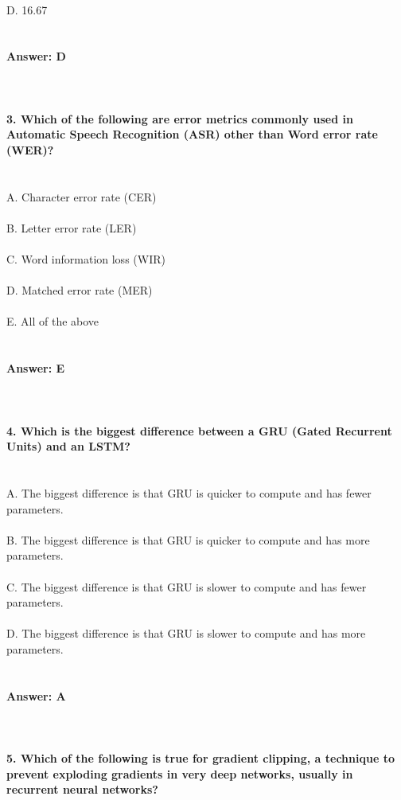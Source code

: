 \documentclass[prl,twocolumn,showpacs,preprintnumbers,superscriptaddress]{revtex4}
\theoremstyle{plain}
\theoremstyle{definition}
\begin{document}
\begin{widetext}
\\
D. 16.67%
\\
\\
\\
\textbf{Answer: D}
\\
\\
\\
\\
\textbf{3. Which of the following are error metrics commonly used in Automatic Speech Recognition (ASR) other than Word error rate (WER)?}
\\
\\
\\
A. Character error rate (CER)
\\
\\
B. Letter error rate (LER)
\\
\\
C. Word information loss (WIR)
\\
\\
D. Matched error rate (MER)
\\
\\
E. All of the above
\\
\\
\\
\textbf{Answer: E}
\\
\\
\\
\\
\textbf{4. Which is the biggest difference between a GRU (Gated Recurrent Units) and an LSTM?}
\\
\\
\\
A. The biggest difference is that GRU is quicker to compute and has fewer parameters.
\\
\\
B. The biggest difference is that GRU is quicker to compute and has more parameters.
\\
\\
C. The biggest difference is that GRU is slower to compute and has fewer parameters.
\\
\\
D. The biggest difference is that GRU is slower to compute and has more parameters.
\\
\\
\\
\textbf{Answer: A}
\\
\\
\\
\\
\textbf{5. Which of the following is true for gradient clipping, a technique to prevent exploding gradients in very deep networks, usually in recurrent neural networks?}

\end{widetext}
\end{document}

